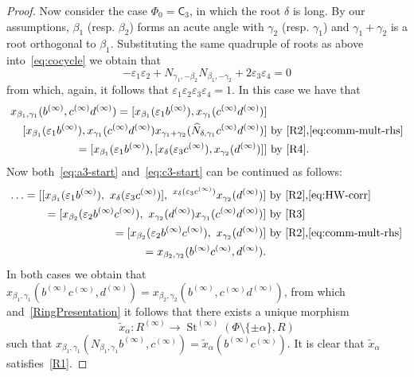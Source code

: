 \documentclass{article}
\numberwithin{equation}{section}
\theoremstyle{definition}
\theoremstyle{remark}
\DeclareMathOperator\St{St}
\newcommand{\rC}{\mathsf{C}}
\begin{document}
\begin{proof}
Now consider the case \(\Phi_0 = \rC_3\), in which the root $\delta$ is long.
By our assumptions, $\beta_1$ (resp. $\beta_2$) forms an acute angle with $\gamma_2$ (resp. $\gamma_1$) and $\gamma_1 + \gamma_2$ is a root orthogonal to $\beta_1$.
Substituting the same quadruple of roots as above into~\eqref{eq:cocycle} we obtain that
 \[-\varepsilon_1 \varepsilon_2 +  N_{\gamma_1,-\beta_2} N_{\beta_1,-\gamma_2} + 2 \varepsilon_3 \varepsilon_4 = 0\]
from which, again, it follows that $\varepsilon_1 \varepsilon_2 \varepsilon_3 \varepsilon_4 = 1$.
In this case we have that
 \begin{align}
 x_{\beta_1, \gamma_1}(b^{(\infty)}, c^{(\infty)} d^{(\infty)}) = [x_{\beta_1}(\varepsilon_1b^{(\infty)}), x_{\gamma_1}(c^{(\infty)} d^{(\infty)})] & \nonumber \\
 [x_{\beta_1}(\varepsilon_1b^{(\infty)}), x_{\gamma_1}(c^{(\infty)} d^{(\infty)}) x_{\gamma_1 + \gamma_2}(\widehat{N}_{\delta,\gamma_1}c^{(\infty)} d^{(\infty)})] & \text{ by~\eqref{R2},\eqref{eq:comm-mult-rhs}} \label{eq:c3-start}\\
 = [x_{\beta_1}(\varepsilon_1b^{(\infty)}), [x_{\delta}(\varepsilon_3c^{(\infty)}), x_{\gamma_2}(d^{(\infty)})]] &\text{ by~\eqref{R4}.} \nonumber
 \end{align}
Now both~\eqref{eq:a3-start} and~\eqref{eq:c3-start} can be continued as follows:
 \begin{align*}
  \ldots = [[x_{\beta_1}(\varepsilon_1b^{(\infty)}),\ x_\delta(\varepsilon_3c^{(\infty)})],\ {}^{x_\delta(\varepsilon_3c^{(\infty)})}x_{\gamma_2}(d^{(\infty)})] & \text{ by~\eqref{R2},\eqref{eq:HW-corr}}\\
 = [x_{\beta_2}(\varepsilon_2b^{(\infty)}c^{(\infty)}),\ x_{\gamma_2}(d^{(\infty)}) x_{\gamma_1}(c^{(\infty)}d^{(\infty)}) ] & \text{ by~\eqref{R3}}\\
 = [x_{\beta_2}(\varepsilon_2b^{(\infty)}c^{(\infty)}),\ x_{\gamma_2}(d^{(\infty)})] &\text{ by~\eqref{R2},\eqref{eq:comm-mult-rhs}} \\
 = x_{\beta_2, \gamma_2}(b^{(\infty)} c^{(\infty)}, d^{(\infty)}). \end{align*}
 In both cases we obtain that \(x_{\beta_1, \gamma_1}(b^{(\infty)} c^{(\infty)}, d^{(\infty)}) = x_{\beta_2, \gamma_2}(b^{(\infty)}, c^{(\infty)} d^{(\infty)})\),
 from which and~\cref{RingPresentation} it follows that there exists a unique morphism \[\widetilde x_\alpha \colon R^{(\infty)} \to \St^{(\infty)}(\Phi \setminus\{\pm \alpha\}, R)\] such that \(x_{\beta_1, \gamma_1}(N_{\beta_1, \gamma_1}b^{(\infty)}, c^{(\infty)}) = \widetilde x_\alpha(b^{(\infty)} c^{(\infty)}).\) It is clear that \(\widetilde x_\alpha\) satisfies~\eqref{R1}.
\end{proof}
\end{document}
